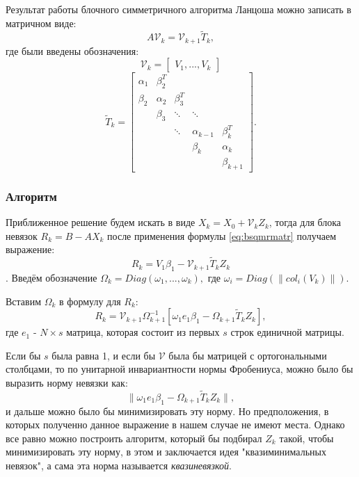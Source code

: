 Результат работы блочного симметричного алгоритма Ланцоша можно записать в матричном
виде:
\begin{equation}
    \label{eq:bsqmrmatr}
A\mathcal{V}_k = \mathcal{V}_{k+1} \tilde{T}_k,
\end{equation}
где были введены обозначения:
\begin{equation*}
    \mathcal{V}_k = \begin{bmatrix} V_1, ... , V_k \end{bmatrix}
\end{equation*}
\begin{equation*}
    \tilde{T}_k = \begin{bmatrix}
                    \alpha_1 & \beta_2^T & & & \\
                    \beta_2 & \alpha_2 & \beta_3^T & & \\
                    & \beta_3 & \ddots & \ddots & \\
                    & & \ddots & \alpha_{k-1} & \beta_{k}^T \\
                    & & & \beta_k & \alpha_k \\
                    & & & & \beta_{k+1}
                  \end{bmatrix}.
\end{equation*}
\subsubsection[Алгоритм]{Алгоритм}

Приближенное решение будем искать в виде $X_k = X_0 + \mathcal{V}_k Z_k$, тогда для 
блока невязок $R_k = B - AX_k$ после применения формулы \eqref{eq:bsqmrmatr} получаем выражение:
$$R_k = V_1 \beta_1 - \mathcal{V}_{k+1}\tilde{T}_k Z_k$$.
Введём обозначение $\Omega_k = Diag(\omega_1,...,\omega_k),$ где $\omega_i = Diag(\| col_i(V_k) \|)$.

Вставим $\Omega_k$ в формулу для $R_k$: 
$$R_k = \mathcal{V}_{k+1} \Omega_{k+1}^{-1} \left[ \omega_1 e_1 \beta_1 - \Omega_{k+1} \tilde{T}_k Z_k \right],$$
где $e_1$ - $N \times s$ матрица, которая состоит из первых $s$ строк единичной матрицы.  

Если бы $s$ была равна 1, и если бы $\mathcal{V}$ была бы матрицей с ортогональными столбцами, то по 
унитарной инвариантности нормы Фробениуса, можно было бы выразить норму невязки как:
$$\| \omega_1 e_1 \beta_1 - \Omega_{k+1} \tilde{T}_k Z_k \|,$$ 
и дальше можно было бы минимизировать эту норму. Но предположения, в которых полученно
данное выражение в нашем случае не имеют места. Однако все равно можно построить алгоритм,
который бы подбирал $Z_k$ такой, чтобы минимизировать эту норму, в этом и заключается идея 
"квазиминимальных невязок", а сама эта норма называется \textit{квазиневязкой}.

